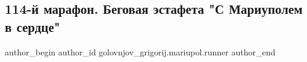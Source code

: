  
 
 
 
 

\subsection{114-й марафон.  Беговая эстафета "С Мариуполем в сердце"}
\label{sec:29_05_2022.fb.golovnjov_grigorij.mariupol.runner.1.114_i_marafon___bego}

\ifcmt
 author_begin
   author_id golovnjov_grigorij.mariupol.runner
 author_end
\fi
